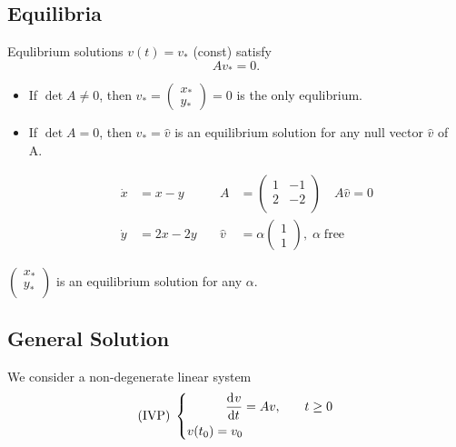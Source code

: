 \documentclass[12pt]{article}
\begin{document}
\subsection{Equilibria}
Equlibrium solutions $v(t)=v_*$ (const) satisfy $$Av_*=0.$$

\begin{itemize}
\item If $\det A\ne0$, then $v_*=\begin{pmatrix} x_* \\
      y_* \end{pmatrix}=0$ is the only equlibrium.
\item If $\det A=0$, then $v_*=\hat{v}$ is an equilibrium solution for any null
  vector $\hat{v}$ of A.

  \begin{equation}
    \begin{aligned}
      \dot{x}&=x-y \quad& A&=
      \begin{pmatrix}
        1 & -1 \\ 2 & -2 \\
      \end{pmatrix}
      \quad A\hat{v} = 0 \\
      \dot{y} &= 2x-2y \quad& \hat{v} &= \alpha
      \begin{pmatrix}
        1 \\ 1
      \end{pmatrix},\; \alpha\;\text{free}
    \end{aligned}
  \end{equation}
\end{itemize}

$
\begin{pmatrix}
  x_* \\ y_* \\
\end{pmatrix}
$ is an equilibrium solution for any $\alpha$.

\subsection{General Solution}
We consider a non-degenerate linear system
\begin{equation} \text{(IVP)}\;\left\{
  \begin{aligned}
    \frac{\mathrm{d}^{} {v}}{\mathrm{d}{t}^{}} &= Av, \quad& t&\ge0 \\
    v(t_0)=v_0 \\
  \end{aligned} \right.
\end{equation}
\end{document}
